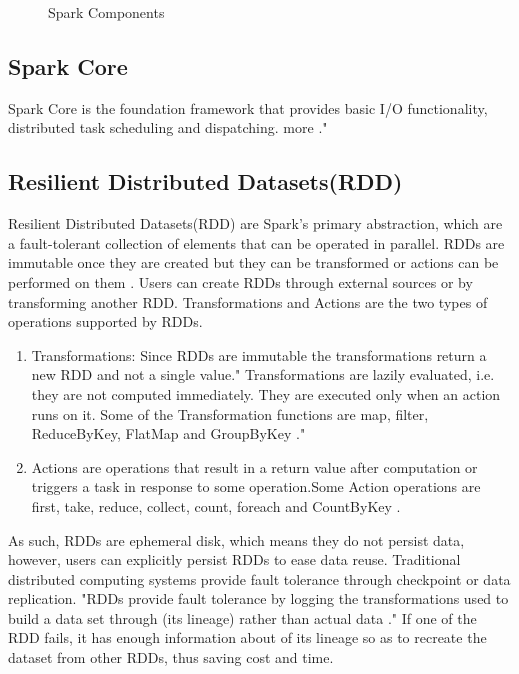 \documentclass[9pt,twocolumn,twoside]{styles/osajnl}
\begin{document}
\begin{figure}[htbp]
\centering
{}
\caption{Spark Components \cite{book-spark}}
\label{fig:spark-stack}
\end{figure}

\subsection{Spark Core}

Spark Core is the foundation framework that provides basic I/O functionality, distributed task scheduling and dispatching.
more \cite{article-spark-1}." 
\subsection{Resilient Distributed Datasets(RDD)}
Resilient Distributed Datasets(RDD) \cite{paper-RDD} are Spark's
primary abstraction, which are a fault-tolerant collection of elements that can be operated in parallel. RDDs are immutable once they are created but they can be transformed or actions can be performed on them \cite{article-spark-1}. Users can create RDDs through external sources or by transforming another RDD. Transformations and Actions are the two
types of operations supported by RDDs.
\begin{enumerate}
\item Transformations: Since RDDs are immutable the transformations return a new RDD and not a single value." Transformations are lazily evaluated, i.e. they are not computed immediately. They are executed
only when an action runs on it. Some of the Transformation functions are map, filter, ReduceByKey, FlatMap and GroupByKey \cite{article-spark-1}."
\item Actions are operations that result in a return
value after computation or triggers a task in response to some
operation.Some Action operations are first, take, reduce,
collect, count, foreach and CountByKey \cite{article-spark-1}.
\end{enumerate}
As such, RDDs are ephemeral disk, which means they do not persist
data, however, users can explicitly persist RDDs to ease data
reuse. Traditional distributed computing systems provide fault
tolerance through checkpoint or data replication. "RDDs provide fault
tolerance by logging the transformations used to build a data set
through (its lineage) rather than actual data \cite{paper-RDD}." If one of the RDD fails, it has enough information about of its lineage so as to recreate the dataset from other RDDs, thus saving cost and time.
\end{document}
